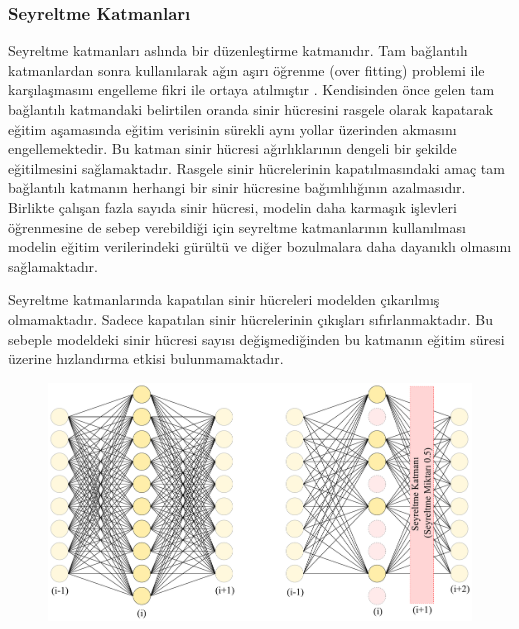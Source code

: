 \subsubsection{Seyreltme Katmanları \label{lyr:dropout}}
Seyreltme katmanları aslında bir düzenleştirme katmanıdır. Tam bağlantılı katmanlardan sonra kullanılarak ağın aşırı öğrenme (over fitting) problemi ile karşılaşmasını engelleme fikri ile ortaya atılmıştır \cite{srivastava2014dropout}. Kendisinden önce gelen tam bağlantılı katmandaki belirtilen oranda sinir hücresini rasgele olarak kapatarak eğitim aşamasında eğitim verisinin sürekli aynı yollar üzerinden akmasını engellemektedir. Bu katman sinir hücresi ağırlıklarının dengeli bir şekilde eğitilmesini sağlamaktadır. Rasgele sinir hücrelerinin kapatılmasındaki amaç tam bağlantılı katmanın herhangi bir sinir hücresine bağımlılığının azalmasıdır. Birlikte çalışan fazla sayıda sinir hücresi, modelin daha karmaşık işlevleri öğrenmesine de sebep verebildiği için seyreltme katmanlarının kullanılması modelin eğitim verilerindeki gürültü ve diğer bozulmalara daha dayanıklı olmasını sağlamaktadır.

Seyreltme katmanlarında kapatılan sinir hücreleri modelden çıkarılmış olmamaktadır. Sadece kapatılan sinir hücrelerinin çıkışları sıfırlanmaktadır. Bu sebeple modeldeki sinir hücresi sayısı değişmediğinden bu katmanın eğitim süresi üzerine hızlandırma etkisi bulunmamaktadır.

\begin{figure}[h!]
	\begin{center}
		\vspace{0.4cm}
		{
			\vspace{0.4cm}
			\includegraphics[scale=0.32]{Yapilan-Calismalar/Figures/dropout.pdf}
		}
	\end{center}
\end{figure}

